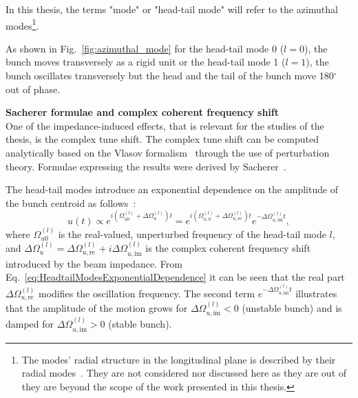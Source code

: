 In this thesis, the terms "mode" or "head-tail mode" will refer to the azimuthal modes\footnote{The modes' radial structure in the longitudinal plane is described by their radial modes~\cite{Chao:collective}. They are not considered nor discussed here as they are out of they are beyond the scope of the work presented in this thesis.}. 

As shown in Fig.~\ref{fig:azimuthal_mode} for the head-tail mode 0 ($l=0$), the bunch moves transversely as a rigid unit or the head-tail mode 1 ($l=1$), the bunch oscillates transversely but the head and the tail of the bunch move 180$^\circ$ out of phase. %

\textbf{Sacherer formulae and complex coherent frequency shift}\\
One of the impedance-induced effects, that is relevant for the studies of the thesis, is the complex tune shift. The complex tune shift can be computed analytically based on the Vlasov formalism~\cite{Vlasov:426186} through the use of perturbation theory. Formulae expressing the results were derived by Sacherer~\cite{Sacherer:322545, Sacherer:322645}. %

The head-tail modes introduce an exponential dependence on the amplitude of the bunch centroid as follows~\cite{Schenk:2665819}:
\begin{equation}\label{eq:HeadtailModesExponentialDependence}
    u(t) \propto e^{i(\Omega_{u0}^{(l)}+\Delta \Omega_u^{(l)})t} =  e^{i(\Omega_{u,0}^{(l)}+\Delta \Omega_{u, \mathrm{{re}}}^{(l)})t} e^{-\Delta \Omega_{u, \mathrm{{im}}}^{(l)} t},
\end{equation}
where $\Omega_{u0}^{(l)}$ is the real-valued, unperturbed frequency of the head-tail mode $l$, and $\Delta \Omega_u ^{(l)} = \Delta \Omega_{u, \mathrm{re}}^{(l)} + i \Delta \Omega_{u, \mathrm{im}}^{(l)}$ is the complex coherent frequency shift introduced by the beam impedance. From Eq.~\eqref{eq:HeadtailModesExponentialDependence} it can be seen that the real part $\Delta \Omega_{u, \mathrm{re}}^{(l)}$ modifies the oscillation frequency. The second term $e^{-\Delta \Omega_{u, \mathrm{im}}^{(l)}t}$ illustrates that the amplitude of the motion grows for $\Delta \Omega_{u, \mathrm{im}}^{(l)}<0$ (unstable bunch) and is damped for $\Delta \Omega_{u, \mathrm{im}}^{(l)}>0$ (stable bunch).


